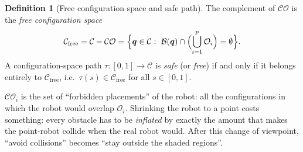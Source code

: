 \documentclass[11pt,a4paper]{article}
\newcommand{\Cspace}{\mathcal{C}}
\newcommand{\Cfree}{\mathcal{C}_{\mathrm{free}}}
\newcommand{\CO}{\mathcal{CO}}
\newcommand{\Obs}{\mathcal{O}}
\newcommand{\Rob}{\mathcal{B}}
\newcommand{\vq}{\boldsymbol{q}}
\theoremstyle{definition}
\newtheorem{definition}{Definition}[section]
\theoremstyle{plain}
\theoremstyle{remark}
\begin{document}
\begin{definition}[Free configuration space and safe path]
The complement of $\CO$ is the \emph{free configuration space}
\[
  \Cfree=\Cspace-\CO=\Bigl\{\vq\in\Cspace:\ \Rob(\vq)\cap\Bigl(\bigcup_{i=1}^{p}\Obs_i\Bigr)=\emptyset\Bigr\}.
\]
A configuration-space path $\tau:[0,1]\to\Cspace$ is \emph{safe} (or \emph{free}) if and only if it belongs entirely to $\Cfree$, i.e.\ $\tau(s)\in\Cfree$ for all $s\in[0,1]$.
\end{definition}

\begin{intuition}
$\CO_i$ is the set of ``forbidden placements'' of the robot: all the configurations in which the robot would overlap $\Obs_i$. Shrinking the robot to a point costs something: every obstacle has to be \emph{inflated} by exactly the amount that makes the point-robot collide when the real robot would. After this change of viewpoint, ``avoid collisions'' becomes ``stay outside the shaded regions''.
\end{intuition}
\end{document}
